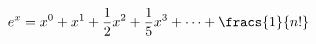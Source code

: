 \documentclass[preview]{standalone}
\begin{document}
\begin{align*}
e^x = x^0 + x^1 + \frac{1}{2} x^2 + \frac{1}{5} x^3 + \cdots + \fracs{1}{n!}
\end{align*}
\end{document}
